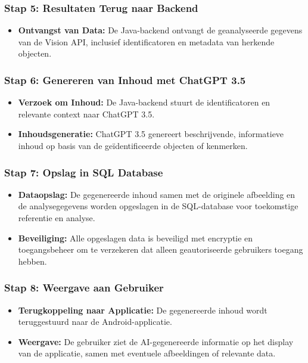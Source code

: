 \subsubsection{Stap 5: Resultaten Terug naar Backend}
\begin{itemize}
    \item \textbf{Ontvangst van Data:} De Java-backend ontvangt de geanalyseerde gegevens van de Vision API, inclusief identificatoren en metadata van herkende objecten.
\end{itemize}

\subsubsection{Stap 6: Genereren van Inhoud met ChatGPT 3.5}
\begin{itemize}
    \item \textbf{Verzoek om Inhoud:} De Java-backend stuurt de identificatoren en relevante context naar ChatGPT 3.5.
    \item \textbf{Inhoudsgeneratie:} ChatGPT 3.5 genereert beschrijvende, informatieve inhoud op basis van de geïdentificeerde objecten of kenmerken.
\end{itemize}

\subsubsection{Stap 7: Opslag in SQL Database}
\begin{itemize}
    \item \textbf{Dataopslag:} De gegenereerde inhoud samen met de originele afbeelding en de analysegegevens worden opgeslagen in de SQL-database voor toekomstige referentie en analyse.
    \item \textbf{Beveiliging:} Alle opgeslagen data is beveiligd met encryptie en toegangsbeheer om te verzekeren dat alleen geautoriseerde gebruikers toegang hebben.
\end{itemize}

\subsubsection{Stap 8: Weergave aan Gebruiker}
\begin{itemize}
    \item \textbf{Terugkoppeling naar Applicatie:} De gegenereerde inhoud wordt teruggestuurd naar de Android-applicatie.
    \item \textbf{Weergave:} De gebruiker ziet de AI-gegenereerde informatie op het display van de applicatie, samen met eventuele afbeeldingen of relevante data.
\end{itemize}

